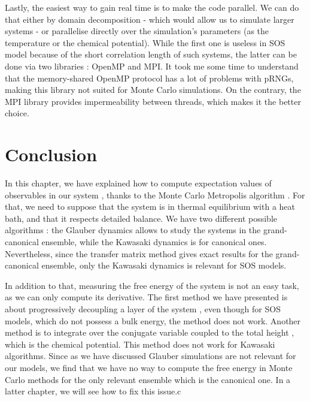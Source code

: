 Lastly, the easiest way to gain real time is to make the code parallel. We can do that either by domain decomposition - which would allow us to simulate larger systems - or parallelise directly over the simulation's parameters (as the temperature or the chemical potential). While the first one is useless in SOS model because of the short correlation length of such systems, the latter can be done via two libraries : OpenMP and MPI. It took me some time to understand that the memory-shared OpenMP protocol has a lot of problems with pRNGs, making this library not suited for Monte Carlo simulations. On the contrary, the MPI library provides impermeability between threads, which makes it the better choice.

\section{Conclusion}

In this chapter, we have explained how to compute expectation values of observables in our system \cite{newman_monte_1999}, thanks to the Monte Carlo Metropolis algorithm \cite{metropolis_monte_1949}. For that, we need to suppose that the system is in thermal equilibrium with a heat bath, and that it respects detailed balance. We have two different possible algorithms : the Glauber dynamics \cite{glauber_timedependent_1963} allows to study the systems in the grand-canonical ensemble, while the Kawasaki dynamics \cite{kawasaki_diffusion_1966} is for canonical ones. Nevertheless, since the transfer matrix method gives exact results for the grand-canonical ensemble, only the Kawasaki dynamics is relevant for SOS models. 

In addition to that, measuring the free energy of the system is not an easy task, as we can only compute its derivative. The first method we have presented is about progressively decoupling a layer of the system \cite{vasilyev_universal_2009}, even though for SOS models, which do not possess a bulk energy, the method does not work. Another method is to integrate over the conjugate variable coupled to the total height \cite{lopes_cardozo_critical_2014}, which is the chemical potential. This method does not work for Kawasaki algorithms. 
Since as we have discussed Glauber simulations are not relevant for our models, we find that we have no way to compute the free energy in Monte Carlo methods for the only relevant ensemble which is the canonical one. In a latter chapter, we will see how to fix this issue.c